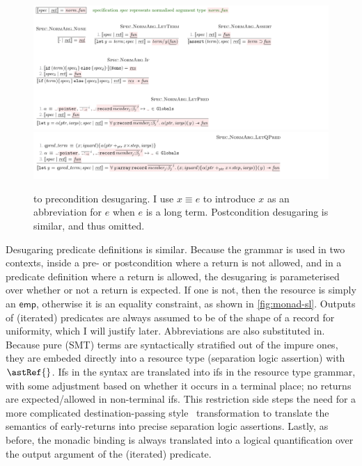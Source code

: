 \begin{figure}[tp]
    \includegraphics{figures/preconditions-to-kernel-1}
    \includegraphics{figures/preconditions-to-kernel-2}
    \caption{ to  precondition desugaring. I use $x \equiv e$
        to introduce $x$ as an abbreviation for $e$ when $e$ is a long term.
        Postcondition desugaring is similar, and thus omitted.}\label{fig:precond-to-kernel}
\end{figure}

Desugaring predicate definitions is similar. Because the grammar is used in two
contexts, inside a pre- or postcondition where a return is not allowed, and in
a predicate definition where a return is allowed, the desugaring is
parameterised over whether or not a return is expected. If one is not, then the
resource is simply an $\mathsf{emp}$, otherwise it is an equality constraint,
as shown in \cref{fig:monad-sl}. Outputs of (iterated) predicates are always
assumed to be of the shape of a record for uniformity, which I will justify
later. Abbreviations are also substituted in.
Because pure (SMT) terms are syntactically stratified out of
the impure ones, they are embeded directly into a resource type (separation
logic assertion) with $\astRef{}$. Ifs in the syntax are translated into ifs in
the resource type grammar, with some adjustment based on whether it occurs in a
terminal place; no returns are expected/allowed in non-terminal
ifs. This restriction side steps the need for a more complicated
destination-passing style~ transformation to
translate the semantics of early-returns into precise separation logic
assertions. Lastly, as before, the monadic binding  is %
always translated into a logical quantification over the output argument of the
(iterated) predicate.

